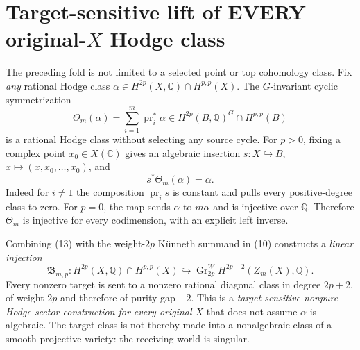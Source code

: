 \documentclass[11pt]{article}
\begin{document}
\section{Target-sensitive lift of EVERY original-$X$ Hodge class}
The preceding fold is not limited to a selected point or top
cohomology class. Fix \emph{any} rational Hodge class
$\alpha\in H^{2p}(X,\mathbb Q)\cap H^{p,p}(X)$.
The $G$-invariant cyclic symmetrization
\[
 \Theta_m(\alpha)=\sum_{i=1}^m\operatorname{pr}_i^*\alpha
 \in H^{2p}(B,\mathbb Q)^G\cap H^{p,p}(B)
 \tag{13}
\]
is a rational Hodge class without selecting any source cycle.
For $p>0$, fixing a complex point $x_0\in X(\mathbb C)$
gives an algebraic insertion
$s:X\hookrightarrow B$, $x\mapsto(x,x_0,\ldots,x_0)$, and
\[
 \boxed{s^*\Theta_m(\alpha)=\alpha.}                     \tag{14}
\]
Indeed for $i\ne1$ the composition $\operatorname{pr}_i s$
is constant and pulls every positive-degree class to zero.
For $p=0$, the map sends $\alpha$ to $m\alpha$ and is
injective over $\mathbb Q$. Therefore $\Theta_m$ is injective
for every codimension, with an explicit left inverse.

Combining (13) with the weight-$2p$ K\"unneth summand
in (10) constructs a \emph{linear injection}
\[
 \boxed{\quad
 \mathfrak B_{m,p}:
 H^{2p}(X,\mathbb Q)\cap H^{p,p}(X)
 \hookrightarrow
 \operatorname{Gr}_{2p}^W H^{2p+2}(Z_m(X),\mathbb Q).
 \quad}                                                \tag{15}
\]
Every nonzero target is sent to a nonzero rational diagonal
class in degree $2p+2$, of weight $2p$ and therefore
of purity gap $-2$.  This is a \emph{target-sensitive
nonpure Hodge-sector construction for every original $X$}
that does not assume $\alpha$ is algebraic.  The target
class is not thereby made into a nonalgebraic class of
a smooth projective variety: the receiving world is singular.
\end{document}
